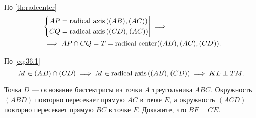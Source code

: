\begin{tasks}
{            По \cref{th:radcenter}
            \begin{equation}\label{eq:36.1}
                \begin{aligned}
                    &\left\{\begin{aligned}
                            AP &= \operatorname{\text{radical axis}}\left((AB), (AC)\right) \\
                            CQ &= \operatorname{\text{radical axis}}\left( (CD), (AC) \right) 
                        \end{aligned}\right| \implies \\
                    &\implies AP \cap CQ = T = \operatorname{\text{radical center}}((AB), (AC), (CD)).
                \end{aligned}
            \end{equation} 

            По \cref{eq:36.1} 
            \begin{equation}
                M \in (AB) \cap (CD) \implies M \in \operatorname{\text{radical axis}}\left( (AB), (CD) \right) \implies KL \perp TM.
            \end{equation} 
        }
    \item Точка $D$ --- основание биссектрисы из точки $A$ треугольника $ABC$. Окружность $(ABD)$ повторно пересекает прямую $AC$ в точке $E$, а окружность $(ACD)$ повторно пересекает прямую $BC$ в точке $F$. Докажите, что $BF = CE$. 



\end{tasks}
